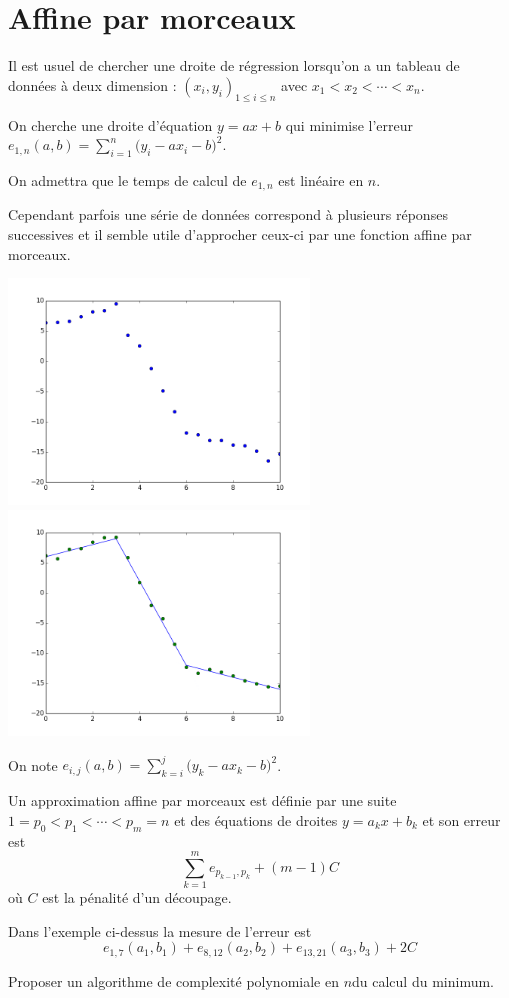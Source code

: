 \chapter{Affine par morceaux}
Il est usuel de chercher une droite de régression lorsqu'on a un tableau de données à deux dimension : $(x_i,y_i)_{1\le i\le n}$ avec $x_1< x_2 < \cdots < x_n$.

On cherche une droite d'équation $y= ax+b$ qui minimise l'erreur $\displaystyle e_{1,n}(a, b)=\sum_{i=1}^n \bigl(y_i-a x_i-b\bigr)^2$. 

On admettra que le temps de calcul de $e_{1,n}$ est linéaire en $n$.

Cependant parfois une série de données correspond à plusieurs réponses successives et il semble utile d'approcher ceux-ci par une fonction affine par morceaux.

\includegraphics[width=8cm]{Oraux/Affine_1.png}
\includegraphics[width=8cm]{Oraux/Affine_2.png}

On note $\displaystyle e_{i, j}(a, b)=\sum_{k=i}^j \bigl(y_k-a x_k-b\bigr)^2$.

Un approximation affine par morceaux est définie par une suite $1=p_0 < p_1 < \cdots < p_m = n$
et des équations de droites $y = a_k x + b_k$ et son erreur est 
\[\sum_{k=1}^m e_{p_{k-1}, p_k} + (m-1) C\]
où $C$ est la pénalité d'un découpage.

Dans l'exemple ci-dessus la mesure de l'erreur est 
\[e_{1,7}(a_1, b_1)+e_{8,12}(a_2, b_2)+e_{13,21}(a_3, b_3) + 2 C\]

Proposer un algorithme de complexité polynomiale en $n$du calcul du minimum.

